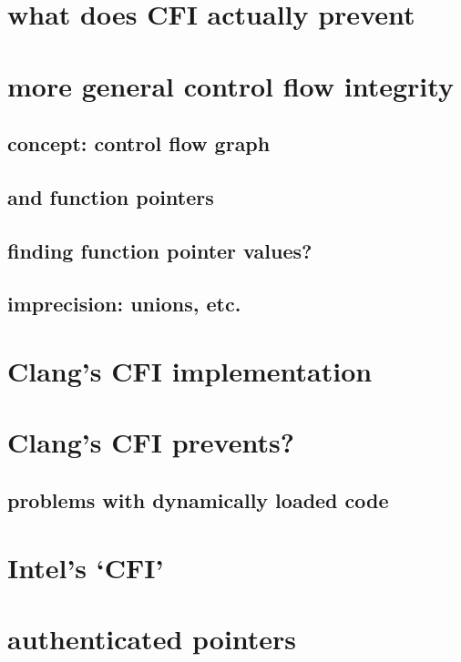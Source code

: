 \section{what does CFI actually prevent}

\section{more general control flow integrity}

\subsection{concept: control flow graph}

\subsection{and function pointers}


\subsection{finding function pointer values?}



\subsection{imprecision: unions, etc.}


\section{Clang's CFI implementation}


\section{Clang's CFI prevents?}


\subsection{problems with dynamically loaded code}


\section{Intel's `CFI'}


\section{authenticated pointers}




